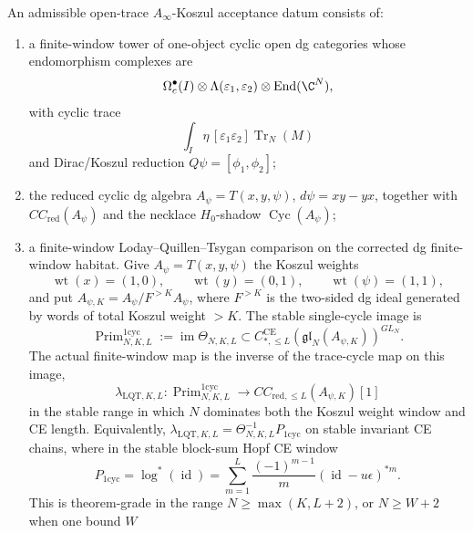 \begin{defn}\label{defn:stable-ainfty-koszul-acceptance-datum}
  An admissible open-trace \(A_\infty\)-Koszul acceptance datum consists of:
  \begin{enumerate}[label=(K\arabic*)]
    \item a finite-window tower of one-object cyclic open dg categories
      whose endomorphism complexes are
      \[
        \Omega_c^\bullet(I)\otimes
        \Lambda(\varepsilon_1,\varepsilon_2)\otimes
        \operatorname{End}(\C^N),
      \]
      with cyclic trace
      \[
        \int_I\eta\,[\varepsilon_1\varepsilon_2]\operatorname{Tr}_N(M)
      \]
      and Dirac/Koszul reduction \(Q\psi=[\phi_1,\phi_2]\);
    \item the reduced cyclic dg algebra
      \(A_\psi=T(x,y,\psi)\), \(d\psi=xy-yx\), together with
      \(CC_{\mathrm{red}}(A_\psi)\) and the necklace
      \(H_0\)-shadow \(\operatorname{Cyc}(A_\psi)\);
    \item a finite-window Loday--Quillen--Tsygan comparison on the
      corrected dg finite-window habitat.  Give
      \(A_\psi=T(x,y,\psi)\) the Koszul weights
      \[
        \operatorname{wt}(x)=(1,0),\qquad
        \operatorname{wt}(y)=(0,1),\qquad
        \operatorname{wt}(\psi)=(1,1),
      \]
      and put
      \(A_{\psi,K}=A_\psi/F^{>K}A_\psi\), where \(F^{>K}\) is the
      two-sided dg ideal generated by words of total Koszul weight
      \(>K\).  The stable single-cycle image is
      \[
        \operatorname{Prim}^{1\mathrm{cyc}}_{N,K,L}
        :=
        \operatorname{im}\Theta_{N,K,L}
        \subset
        C_{*,\le L}^{\mathrm{CE}}(\mathfrak{gl}_N(A_{\psi,K}))^{GL_N}.
      \]
      The actual finite-window map is the inverse of the
      trace-cycle map on this image,
      \[
        \lambda_{\mathrm{LQT},K,L}\colon
        \operatorname{Prim}^{1\mathrm{cyc}}_{N,K,L}
        \longrightarrow
        CC_{\mathrm{red},\le L}(A_{\psi,K})[1]
      \]
      in the stable range in which \(N\) dominates both the Koszul
      weight window and CE length.  Equivalently,
      \(\lambda_{\mathrm{LQT},K,L}
      =\Theta_{N,K,L}^{-1}P_{1\mathrm{cyc}}\)
      on stable invariant CE chains, where in the stable block-sum Hopf
      CE window
      \[
        P_{1\mathrm{cyc}}
        =
        \log^*(\operatorname{id})
        =
        \sum_{m=1}^{L}\frac{(-1)^{m-1}}{m}
        (\operatorname{id}-u\epsilon)^{*m}.
      \]
      This is theorem-grade in the range
      \(N\geq\max(K,L+2)\), or \(N\geq W+2\) when one bound \(W\)

\end{enumerate}
\end{defn}
